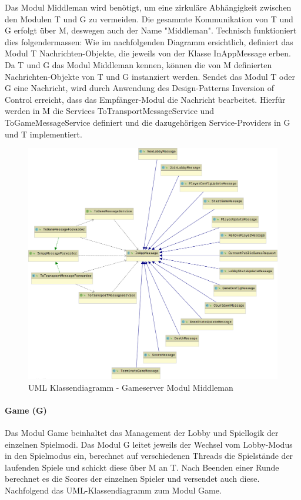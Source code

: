 \documentclass[11pt,ngerman]{article}
\begin{document}
	Das Modul Middleman wird benötigt, um eine zirkuläre Abhängigkeit zwischen den Modulen T und G zu vermeiden. Die gesammte Kommunikation von T und G erfolgt über M, deswegen auch der Name "Middleman". Technisch funktioniert dies folgendermassen: Wie im nachfolgenden Diagramm ersichtlich, definiert das Modul T Nachrichten-Objekte, die jeweils von der Klasse InAppMessage erben. Da T und G das Modul Middleman kennen, können die von M definierten Nachrichten-Objekte von T und G instanziert werden. Sendet das Modul T oder G eine Nachricht, wird durch Anwendung des Design-Patterns Inversion of Control erreicht, dass das Empfänger-Modul die Nachricht bearbeitet. Hierfür werden in M die Services ToTransportMessageService und ToGameMessageService definiert und die dazugehörigen Service-Providers in G und T implementiert.

	\begin{figure}[H]
    	\centering
    	\includegraphics[scale=0.2]{figures/gameserver-uml/middleman-classes.png}
    	\caption{UML Klassendiagramm - Gameserver Modul Middleman}
    	\label{fig:UMLModulMiddleman}
    \end{figure}

    \paragraph{Game (G)}
	Das Modul Game beinhaltet das Management der \Gls{Lobby} und Spiellogik der einzelnen Spielmodi. Das Modul G leitet jeweils der Wechsel vom \Gls{Lobby}-Modus in den Spielmodus ein, berechnet auf verschiedenen Threads die Spielstände der laufenden Spiele und schickt diese über M an T. Nach Beenden einer Runde berechnet es die Scores der einzelnen Spieler und versendet auch diese. Nachfolgend das UML-Klassendiagramm zum Modul Game.
\end{document}

